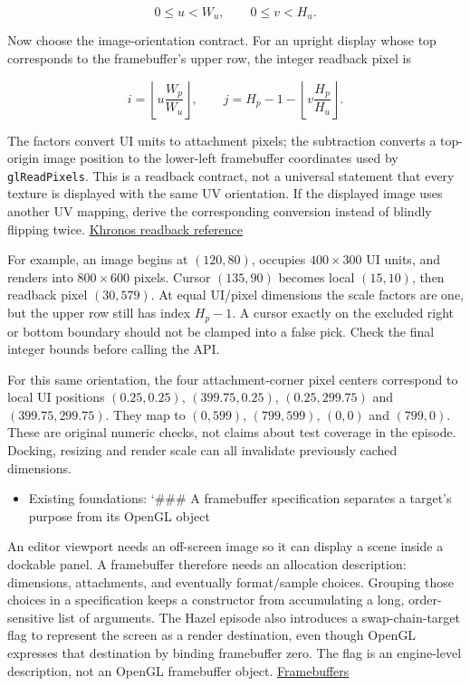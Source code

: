 \[0\leq u<W_u,\qquad0\leq v<H_u.\]

Now choose the image-orientation contract. For an upright display whose top corresponds to the framebuffer's upper row, the integer readback pixel is

\[
i=\left\lfloor u\frac{W_p}{W_u}\right\rfloor,
\qquad
j=H_p-1-\left\lfloor v\frac{H_p}{H_u}\right\rfloor.
\]

The factors convert UI units to attachment pixels; the subtraction converts a top-origin image position to the lower-left framebuffer coordinates used by \texttt{glReadPixels}. This is a readback contract, not a universal statement that every texture is displayed with the same UV orientation. If the displayed image uses another UV mapping, derive the corresponding conversion instead of blindly flipping twice. \href{https://github.com/KhronosGroup/OpenGL-Refpages/blob/main/gl4/glReadPixels.xml}{Khronos readback reference}

For example, an image begins at \((120,80)\), occupies \(400\times300\) UI units, and renders into \(800\times600\) pixels. Cursor \((135,90)\) becomes local \((15,10)\), then readback pixel \((30,579)\). At equal UI/pixel dimensions the scale factors are one, but the upper row still has index \(H_p-1\). A cursor exactly on the excluded right or bottom boundary should not be clamped into a false pick. Check the final integer bounds before calling the API.

For this same orientation, the four attachment-corner pixel centers correspond to local UI positions \((0.25,0.25)\), \((399.75,0.25)\), \((0.25,299.75)\) and \((399.75,299.75)\). They map to \((0,599)\), \((799,599)\), \((0,0)\) and \((799,0)\). These are original numeric checks, not claims about test coverage in the episode. Docking, resizing and render scale can all invalidate previously cached dimensions.

\begin{itemize}
\tightlist
\item
  Existing foundations: `\#\#\# A framebuffer specification separates a target's purpose from its OpenGL object
\end{itemize}

An editor viewport needs an off-screen image so it can display a scene inside a dockable panel. A framebuffer therefore needs an allocation description: dimensions, attachments, and eventually format/sample choices. Grouping those choices in a specification keeps a constructor from accumulating a long, order-sensitive list of arguments. The Hazel episode also introduces a swap-chain-target flag to represent the screen as a render destination, even though OpenGL expresses that destination by binding framebuffer zero. The flag is an engine-level description, not an OpenGL framebuffer object. \href{https://www.youtube.com/watch?v=93bavRgVcwA}{Framebuffers}

